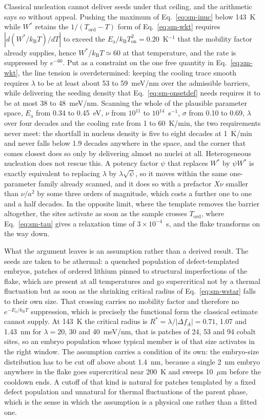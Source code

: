 \documentclass[reprint,twocolumn,prb,amsmath,amssymb,superscriptaddress,floatfix]{revtex4-2}
\newcommand{\kB}{k_{\mathrm{B}}}
\newcommand{\Ea}{E_{\mathrm{a}}}
\newcommand{\Ton}{T_{\mathrm{on}}}
\newcommand{\Tcol}{T_{\mathrm{ord}}}
\begin{document}
Classical nucleation cannot deliver seeds under that ceiling, and the arithmetic says so
without appeal. Pushing the maximum of Eq.~\eqref{eq:sm-inuc} below 143~K while $W^{*}$ retains
the $1/(\Tcol-T)$ form of Eq.~\eqref{eq:sm-wkt} requires $|d(W^{*}/\kB T)/dT|$ to exceed the
$\Ea/\kB\Ton^{2}=0.20$~K$^{-1}$ that the mobility factor already supplies, hence
$W^{*}/\kB T\simeq60$ at that temperature, and the rate is suppressed
by $e^{-60}$. Put as a constraint on the one free quantity in Eq.~\eqref{eq:sm-wkt}, the line
tension is overdetermined: keeping the cooling trace smooth requires $\lambda$ to be at least
about 53 to 59~meV/nm over the admissible barriers, while delivering the seeding density that
Eq.~\eqref{eq:sm-onsetdef} needs requires it to be at most 38 to 48~meV/nm. Scanning the whole
of the plausible parameter space, $\Ea$ from 0.34 to 0.45~eV, $\nu$ from $10^{11}$ to
$10^{14}$~s$^{-1}$, $\sigma$ from 0.10 to 0.69, $\lambda$ over four decades and the cooling rate
from 1 to 60~K/min, the two requirements never meet: the shortfall in nucleus density is five
to eight decades at 1~K/min and never falls below 1.9 decades anywhere in the space, and the
corner that comes closest does so only by delivering almost no nuclei at all. Heterogeneous
nucleation does not rescue this. A potency factor $\psi$ that replaces $W^{*}$ by $\psi W^{*}$
is exactly equivalent to replacing $\lambda$ by $\lambda\sqrt{\psi}$, so it moves within the
same one-parameter family already scanned, and it does so with a prefactor $X\nu$ smaller than
$\nu/a^{2}$ by some three orders of magnitude, which costs a further one to one and a half
decades. In the opposite limit, where the template removes the barrier altogether, the sites
activate as soon as the sample crosses $\Tcol$, where Eq.~\eqref{eq:sm-tau} gives a relaxation
time of $3\times10^{-4}$~s, and the flake transforms on the way down.

What the argument leaves is an assumption rather than a derived result.
The seeds are taken to be athermal: a quenched population of defect-templated embryos, patches
of ordered lithium pinned to structural imperfections of the flake, which are present at all
temperatures and go supercritical not by a thermal fluctuation but as soon as the shrinking
critical radius of Eq.~\eqref{eq:sm-wstar} falls to their own size. That crossing carries no
mobility factor and therefore no $e^{-\Ea/\kB T}$ suppression, which is precisely the functional
form the classical estimate cannot supply. At 143~K the critical radius is
$R^{*}=\lambda/|\Delta f_{A}|=0.71$, 1.07 and 1.43~nm for $\lambda=20$, 30 and 40~meV/nm, that
is patches of 24, 53 and 94 cobalt sites, so an embryo population whose typical member is of
that size activates in the right window. The assumption carries a condition of its own: the
embryo-size distribution has to be cut off above about 1.4~nm, because a single
2~nm embryo anywhere in the flake goes supercritical near 200~K and sweeps 10~$\mu$m before the
cooldown ends. A cutoff of that kind is natural for patches templated by a fixed defect
population and unnatural for thermal fluctuations of the parent phase, which is the sense in
which the assumption is a physical one rather than a fitted one.
\end{document}
